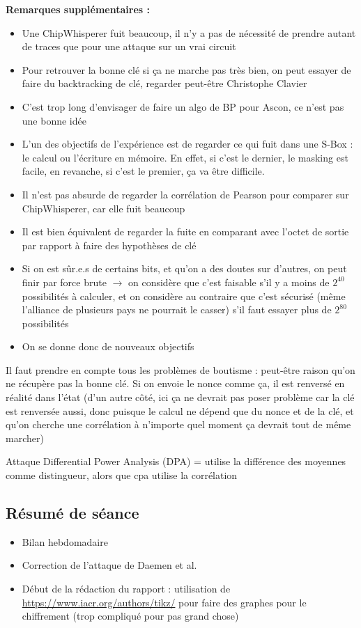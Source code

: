 \documentclass[12pt]{article}
\begin{document}
	\noindent \textbf{Remarques supplémentaires :}
	\begin{itemize}
		\item Une ChipWhisperer fuit beaucoup, il n'y a pas de nécessité de prendre autant de traces que pour une attaque sur un vrai circuit
		\item Pour retrouver la bonne clé si ça ne marche pas très bien, on peut essayer de faire du backtracking de clé, regarder peut-être Christophe Clavier
		\item C'est trop long d'envisager de faire un algo de BP pour Ascon, ce n'est pas une bonne idée
		\item L'un des objectifs de l'expérience est de regarder ce qui fuit dans une S-Box : le calcul ou l'écriture en mémoire. En effet, si c'est le dernier, le masking est facile, en revanche, si c'est le premier, ça va être difficile.
		\item Il n'est pas absurde de regarder la corrélation de Pearson pour comparer sur ChipWhisperer, car elle fuit beaucoup
		\item Il est bien équivalent de regarder la fuite en comparant avec l'octet de sortie par rapport à faire des hypothèses de clé
		\item Si on est sûr.e.s de certains bits, et qu'on a des doutes sur d'autres, on peut finir par force brute $\rightarrow$ on considère que c'est faisable s'il y a moins de $2^{40}$ possibilités à calculer, et on considère au contraire que c'est sécurisé (même l'alliance de plusieurs pays ne pourrait le casser) s'il faut essayer plus de $2^{80}$ possibilités
		\item On se donne donc de nouveaux objectifs
	\end{itemize}
	Il faut prendre en compte tous les problèmes de boutisme : peut-être raison qu'on ne récupère pas la bonne clé. Si on envoie le nonce comme ça, il est renversé en réalité dans l'état (d'un autre côté, ici ça ne devrait pas poser problème car la clé est renversée aussi, donc puisque le calcul ne dépend que du nonce et de la clé, et qu'on cherche une corrélation à n'importe quel moment ça devrait tout de même marcher)
	
	\noindent Attaque Differential Power Analysis (DPA) = utilise la différence des moyennes comme distingueur, alors que cpa utilise la corrélation
	
	\subsection{Résumé de séance}
	\begin{itemize}
		\item Bilan hebdomadaire
		\item Correction de l'attaque de Daemen et al.
		\item Début de la rédaction du rapport : utilisation de \url{https://www.iacr.org/authors/tikz/} pour faire des graphes pour le chiffrement (trop compliqué pour pas grand chose)
	\end{itemize}
	
\end{document}
